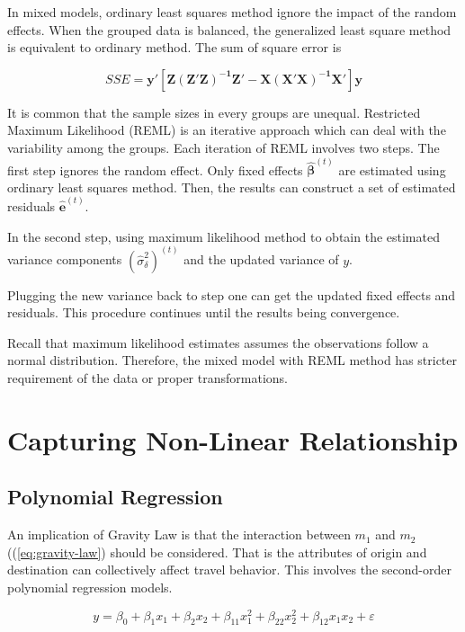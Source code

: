 \documentclass[
  11pt,
  openany]{memoir}
\begin{document}
In mixed models, ordinary least squares method ignore the impact of the random effects.
When the grouped data is balanced, the generalized least square method is equivalent to ordinary method. The sum of square error is

\[SSE=\mathbf{y'[Z(Z'Z)^{-1}Z'-X(X'X)^{-1}X']y}\]

It is common that the sample sizes in every groups are unequal.
Restricted Maximum Likelihood (REML) is an iterative approach which can deal with the variability among the groups.
Each iteration of REML involves two steps.
The first step ignores the random effect. Only fixed effects \(\boldsymbol{\hat\beta}^{(t)}\) are estimated using ordinary least squares method. Then, the results can construct a set of estimated residuals \(\mathbf{\hat e}^{(t)}\).

In the second step, using maximum likelihood method to obtain the estimated variance components \((\hat\sigma^2_\delta)^{(t)}\) and the updated variance of \(y\).

Plugging the new variance back to step one can get the updated fixed effects and residuals.
This procedure continues until the results being convergence.

Recall that maximum likelihood estimates assumes the observations follow a normal distribution.
Therefore, the mixed model with REML method has stricter requirement of the data or proper transformations.

\hypertarget{capturing-non-linear-relationship}{%
\section{Capturing Non-Linear Relationship}\label{capturing-non-linear-relationship}}

\hypertarget{polynomial-regression}{%
\subsection{Polynomial Regression}\label{polynomial-regression}}

An implication of Gravity Law is that the interaction between \(m_1\) and \(m_2\) ((\eqref{eq:gravity-law}) should be considered. That is the attributes of origin and destination can collectively affect travel behavior.
This involves the second-order polynomial regression models.

\begin{equation}
y=\beta_0+\beta_1x_1+\beta_2x_2+\beta_{11}x_1^2+\beta_{22}x_2^2+\beta_{12}x_1x_2+\varepsilon
\label{eq:polym}
\end{equation}
\end{document}
